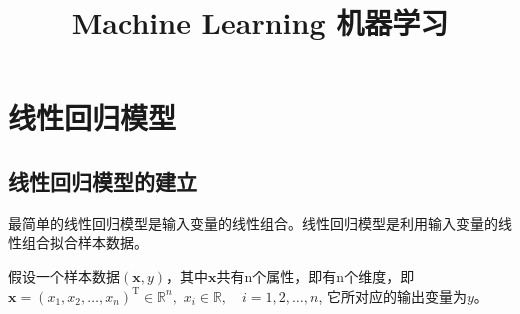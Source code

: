 \documentclass[withoutpreface,bwprint]{NoteBook}
\title{Machine Learning 机器学习}  %
\begin{document}
\maketitle






\tableofcontents  %
\newpage





\section{线性回归模型}
\subsection{线性回归模型的建立}
最简单的线性回归模型是输入变量的线性组合。线性回归模型是利用输入变量的线性组合拟合样本数据。

假设一个样本数据$(\mathbf{x},y)$，其中$\mathbf{x}$共有n个属性，即有n个维度，即$\mathbf{x} = (x_1, x_2, \dots, x_n)^\mathrm{T} \in \mathbb{R}^n, $
$ x_i \in \mathbb{R}, \quad i=1,2,\dots ,n $,
它所对应的输出变量为$y$。
\end{document}
